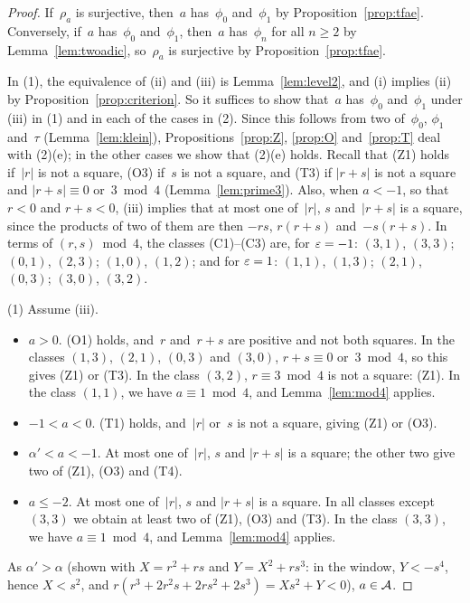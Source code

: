 \begin{proof}
  \leanok
  If~$\rho_a$ is surjective, then~$a$ has~$\phi_0$ and~$\phi_1$ by Proposition~\ref{prop:tfae}.
  Conversely, if~$a$ has~$\phi_0$ and~$\phi_1$, then~$a$ has~$\phi_n$ for all $n \ge 2$ by
  Lemma~\ref{lem:twoadic}, so~$\rho_a$ is surjective by Proposition~\ref{prop:tfae}.

  In (1), the equivalence of (ii) and (iii) is Lemma~\ref{lem:level2}, and (i) implies (ii) by
  Proposition~\ref{prop:criterion}. So it suffices to show that~$a$ has~$\phi_0$ and~$\phi_1$
  under (iii) in (1) and in each of the cases in (2). Since this follows from two of~$\phi_0$,
  $\phi_1$ and~$\tau$ (Lemma~\ref{lem:klein}), Propositions~\ref{prop:Z}, \ref{prop:O}
  and~\ref{prop:T} deal with (2)(e); in the other cases we show that (2)(e) holds. Recall that
  (Z1) holds if~$|r|$ is not a square, (O3) if~$s$ is not a square, and (T3) if
  $|r + s|$ is not a square and $|r + s| \equiv 0$ or~$3 \bmod 4$ (Lemma~\ref{lem:prime3}). Also,
  when $a < -1$, so that $r < 0$ and $r + s < 0$, (iii) implies that at most one of~$|r|$, $s$
  and~$|r + s|$ is a square, since the products of two of them are then $-rs$, $r(r+s)$
  and~$-s(r+s)$. In terms of $(r, s) \bmod 4$, the classes (C1)--(C3) are, for $\varepsilon = -1$:
  $(3,1)$, $(3,3)$; $(0,1)$, $(2,3)$; $(1,0)$, $(1,2)$; and for $\varepsilon = 1$: $(1,1)$, $(1,3)$;
  $(2,1)$, $(0,3)$; $(3,0)$, $(3,2)$.

  (1) Assume (iii).
  \begin{itemize}
    \item $a > 0$. (O1) holds, and~$r$ and~$r + s$ are positive and not both squares. In the
          classes $(1,3)$, $(2,1)$, $(0,3)$ and $(3,0)$, $r + s \equiv 0$ or~$3 \bmod 4$, so this
          gives (Z1) or (T3). In the class $(3,2)$, $r \equiv 3 \bmod 4$ is not a square: (Z1).
          In the class $(1,1)$, we have $a \equiv 1 \bmod 4$, and Lemma~\ref{lem:mod4} applies.
    \item $-1 < a < 0$. (T1) holds, and~$|r|$ or~$s$ is not a square, giving (Z1) or (O3).
    \item $\alpha' < a < -1$. At most one of~$|r|$, $s$ and $|r + s|$ is a square; the other two
          give two of (Z1), (O3) and (T4).
    \item $a \le -2$. At most one of~$|r|$, $s$ and $|r + s|$ is a square. In all classes except
          $(3,3)$ we obtain at least two of (Z1), (O3) and (T3). In the class $(3,3)$, we have
          $a \equiv 1 \bmod 4$, and Lemma~\ref{lem:mod4} applies.
  \end{itemize}
  As $\alpha' > \alpha$ (shown with $X = r^2 + rs$ and $Y = X^2 + rs^3$: in the window,
  $Y < -s^4$, hence $X < s^2$, and $r(r^3 + 2r^2 s + 2rs^2 + 2s^3) = X s^2 + Y < 0$), $a \in \mathcal{A}$.


\end{proof}
